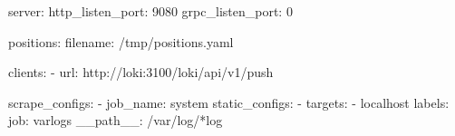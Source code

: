 {
\begin{spverbatim}
    server:
    http_listen_port: 9080
    grpc_listen_port: 0
  
  positions:
    filename: /tmp/positions.yaml
  
  clients:
    - url: http://loki:3100/loki/api/v1/push
  
  scrape_configs:
  - job_name: system
    static_configs:
    - targets:
        - localhost
      labels:
        job: varlogs
        __path__: /var/log/*log
  
\end{spverbatim}
}